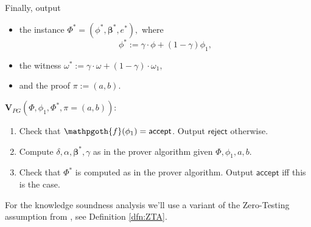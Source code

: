 \documentclass[11pt]{article} %
\newcommand{\rej}{\ensuremath{\mathsf{reject}}\xspace}
\newcommand{\acc}{\ensuremath{\mathsf{accept}}\xspace}
\newcommand{\defeq}{:=}
\newcommand{\prf}{\ensuremath{\mathsf{\pi}}\xspace}
\newcommand{\inst}{\ensuremath{\phi}\xspace}
\newcommand{\wit}{\ensuremath{\mathsf{\omega}}\xspace}
\newcommand{\ver}{\ensuremath{\mathsf{\mathbf{V}}}\xspace}
\newcommand{\verpg}{\ensuremath{\ver_{PG}}\xspace}
\newcommand{\betaa}{\ensuremath{\mathbf{\boldsymbol{\beta}}}\xspace}
\newcommand{\instt}{\ensuremath{\Phi^*}\xspace}
\newcommand{\insttbase}{\ensuremath{\Phi}\xspace}
\newcommand{\inststar}{\ensuremath{\inst^*}\xspace}
\newcommand{\witstar}{\ensuremath{\wit^*}\xspace}
\newcommand{\predinst}{\ensuremath{\mathpgoth{f}}\xspace}
\begin{document}
Finally, output
\begin{itemize}
\item the instance
$\instt=(\inststar,\betaa^*,e^*),$
where \[\inst^*\defeq \gamma\cdot \inst + (1-\gamma) \inst_1,\]


\item the witness 
$\witstar\defeq \gamma\cdot \wit + (1-\gamma)\cdot \wit_1,$
\item and the proof $\prf\defeq (a,b)$.\\
\end{itemize}
\noindent
\underline{$\verpg(\insttbase,\inst_1, \instt,\pi=(a,b)):$}\noindent
\begin{enumerate}
\item Check that $\predinst(\inst_1)=\acc$. Output \rej otherwise.
 \item Compute $\delta,\alpha,\betaa^*, \gamma$ as in the prover algorithm given $\insttbase,\inst_1,a,b$.

\item Check that $\instt$ is computed as in the prover algorithm. Output \acc iff this is the case. 
\end{enumerate}



For the knowledge soundness analysis we'll use a variant of the Zero-Testing assumption from \cite{novarecursive}, see Definition \ref{dfn:ZTA}.
\end{document}
